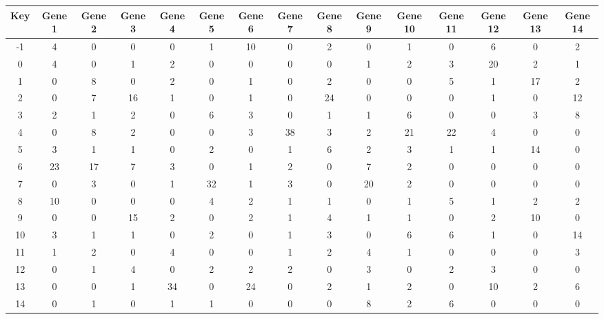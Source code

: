 \begin{tabular}{|c|c|c|c|c|c|c|c|c|c|c|c|c|c|c|}
\hline
Key & Gene 1 & Gene 2 & Gene 3 & Gene 4 & Gene 5 & Gene 6 & Gene 7 & Gene 8 & Gene 9 & Gene 10 & Gene 11 & Gene 12 & Gene 13 & Gene 14 \\
\hline
-1 & 4 & 0 & 0 & 0 & 1 & 10 & 0 & 2 & 0 & 1 & 0 & 6 & 0 & 2 \\
0 & 4 & 0 & 1 & 2 & 0 & 0 & 0 & 0 & 1 & 2 & 3 & 20 & 2 & 1 \\
1 & 0 & 8 & 0 & 2 & 0 & 1 & 0 & 2 & 0 & 0 & 5 & 1 & 17 & 2 \\
2 & 0 & 7 & 16 & 1 & 0 & 1 & 0 & 24 & 0 & 0 & 0 & 1 & 0 & 12 \\
3 & 2 & 1 & 2 & 0 & 6 & 3 & 0 & 1 & 1 & 6 & 0 & 0 & 3 & 8 \\
4 & 0 & 8 & 2 & 0 & 0 & 3 & 38 & 3 & 2 & 21 & 22 & 4 & 0 & 0 \\
5 & 3 & 1 & 1 & 0 & 2 & 0 & 1 & 6 & 2 & 3 & 1 & 1 & 14 & 0 \\
6 & 23 & 17 & 7 & 3 & 0 & 1 & 2 & 0 & 7 & 2 & 0 & 0 & 0 & 0 \\
7 & 0 & 3 & 0 & 1 & 32 & 1 & 3 & 0 & 20 & 2 & 0 & 0 & 0 & 0 \\
8 & 10 & 0 & 0 & 0 & 4 & 2 & 1 & 1 & 0 & 1 & 5 & 1 & 2 & 2 \\
9 & 0 & 0 & 15 & 2 & 0 & 2 & 1 & 4 & 1 & 1 & 0 & 2 & 10 & 0 \\
10 & 3 & 1 & 1 & 0 & 2 & 0 & 1 & 3 & 0 & 6 & 6 & 1 & 0 & 14 \\
11 & 1 & 2 & 0 & 4 & 0 & 0 & 1 & 2 & 4 & 1 & 0 & 0 & 0 & 3 \\
12 & 0 & 1 & 4 & 0 & 2 & 2 & 2 & 0 & 3 & 0 & 2 & 3 & 0 & 0 \\
13 & 0 & 0 & 1 & 34 & 0 & 24 & 0 & 2 & 1 & 2 & 0 & 10 & 2 & 6 \\
14 & 0 & 1 & 0 & 1 & 1 & 0 & 0 & 0 & 8 & 2 & 6 & 0 & 0 & 0 \\
\hline
\end{tabular}